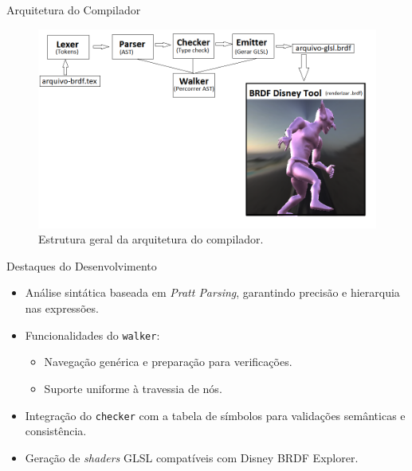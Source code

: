 \begin{frame}{Arquitetura do Compilador}
    \begin{figure}
        \centering
        \includegraphics[scale=0.35]{./Imagens/estutura-geral-do-projeto.png}
        \caption{\small Estrutura geral da arquitetura do compilador.}
    \end{figure}
\end{frame}

\begin{frame}{Destaques do Desenvolvimento}
    \begin{itemize}
        \item Análise sintática baseada em \textit{Pratt Parsing}, garantindo precisão e hierarquia nas expressões.
        \item Funcionalidades do \texttt{walker}:
        \begin{itemize}
            \item Navegação genérica e preparação para verificações.
            \item Suporte uniforme à travessia de nós.
        \end{itemize}
        \item Integração do \texttt{checker} com a tabela de símbolos para validações semânticas e consistência.
        \item Geração de \textit{shaders} GLSL compatíveis com Disney BRDF Explorer.
    \end{itemize}
\end{frame}

